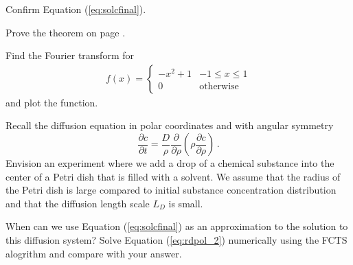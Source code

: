 \begin{exerciseregion}

	\begin{exercise}
		Confirm Equation (\ref{eq:solcfinal}).
	\end{exercise}
	
	\begin{exercise}
		Prove the theorem on page \pageref{missingproof}. 
	\end{exercise}

	\begin{exercise}
		Find the Fourier transform for 
		\begin{eqnarray}
			f(x) =
			\left\{
		    \begin{array}{ll}
		        -x^2+1 & -1 \leq x \leq 1 \\
					0 &  \text{otherwise}
			\end{array}
			\right.
		\end{eqnarray}
		and plot the function.
	\end{exercise}

	\begin{exploration}
		Recall the diffusion equation in polar coordinates and with angular symmetry 
		\begin{equation}
			\label{eq:rdpol_2}
				\frac{\partial c}{\partial t} = 
			\frac{D}{\rho}\frac{\partial}{\partial \rho}
			\left(\rho\frac{\partial c}{\partial \rho} \right) \, .
		\end{equation}
		Envision an experiment where we add a drop of a chemical substance into the 
		center of a Petri dish that is filled with a solvent. 
		We assume that the radius of the Petri dish is large 
		compared to initial substance concentration distribution and that the diffusion length scale $L_D$ 
		is small. 

		When can we use Equation (\ref{eq:solcfinal}) as an approximation to the solution 
		to this diffusion system? Solve Equation (\ref{eq:rdpol_2}) numerically using the 
		FCTS alogrithm and compare with your answer.
	\end{exploration}
\end{exerciseregion}

